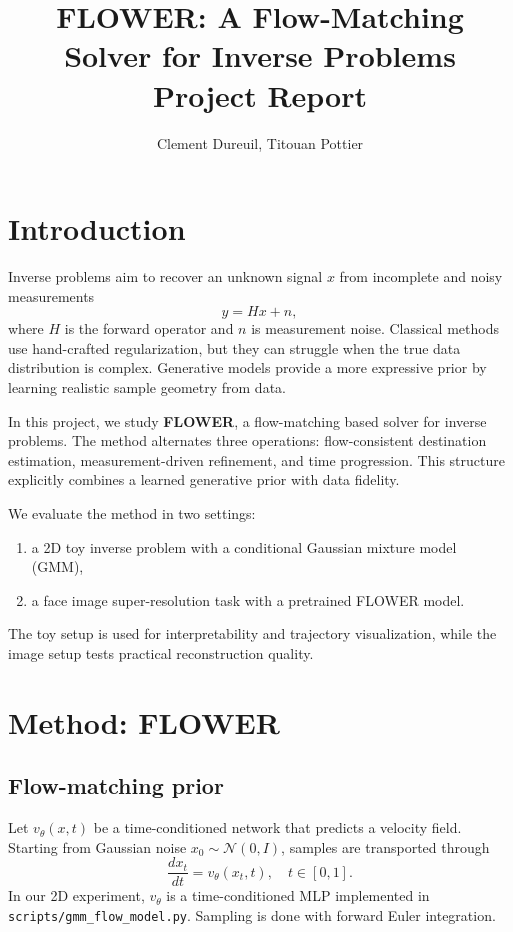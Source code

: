 \documentclass[11pt]{article}
\title{FLOWER: A Flow-Matching Solver for Inverse Problems \\[0.3em]
\large Project Report}
\author{Clement Dureuil, Titouan Pottier}
\date{}
\begin{document}
\maketitle

\section{Introduction}
\noindent
Inverse problems aim to recover an unknown signal $x$ from incomplete and noisy measurements
\begin{equation}
    y = Hx + n,
\end{equation}
where $H$ is the forward operator and $n$ is measurement noise.
Classical methods use hand-crafted regularization, but they can struggle when the true data distribution is complex.
Generative models provide a more expressive prior by learning realistic sample geometry from data.

\medskip
\noindent
In this project, we study \textbf{FLOWER}, a flow-matching based solver for inverse problems.
The method alternates three operations: flow-consistent destination estimation, measurement-driven refinement, and time progression.
This structure explicitly combines a learned generative prior with data fidelity.

\medskip
\noindent
We evaluate the method in two settings:
\begin{enumerate}
    \item a 2D toy inverse problem with a conditional Gaussian mixture model (GMM),
    \item a face image super-resolution task with a pretrained FLOWER model.
\end{enumerate}
The toy setup is used for interpretability and trajectory visualization, while the image setup tests practical reconstruction quality.

\section{Method: FLOWER}
\subsection{Flow-matching prior}
Let $v_{\theta}(x,t)$ be a time-conditioned network that predicts a velocity field.
Starting from Gaussian noise $x_0 \sim \mathcal{N}(0,I)$, samples are transported through
\begin{equation}
    \frac{dx_t}{dt} = v_{\theta}(x_t,t), \quad t \in [0,1].
\end{equation}
In our 2D experiment, $v_{\theta}$ is a time-conditioned MLP implemented in \texttt{scripts/gmm\_flow\_model.py}.
Sampling is done with forward Euler integration.
\end{document}
